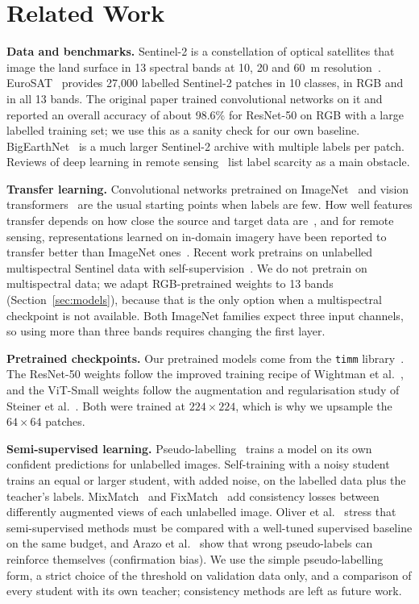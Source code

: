\documentclass[conference]{IEEEtran}
\begin{document}
\section{Related Work}\label{sec:related}
\textbf{Data and benchmarks.} Sentinel-2 is a constellation of optical satellites that image the land surface in 13 spectral bands at 10, 20 and 60~m resolution~\cite{drusch2012sentinel}. EuroSAT~\cite{helber2019eurosat} provides 27{,}000 labelled Sentinel-2 patches in 10 classes, in RGB and in all 13 bands. The original paper trained convolutional networks on it and reported an overall accuracy of about 98.6\% for ResNet-50 on RGB with a large labelled training set; we use this as a sanity check for our own baseline. BigEarthNet~\cite{sumbul2019bigearthnet} is a much larger Sentinel-2 archive with multiple labels per patch. Reviews of deep learning in remote sensing~\cite{zhu2017review} list label scarcity as a main obstacle.

\textbf{Transfer learning.} Convolutional networks pretrained on ImageNet~\cite{he2016resnet} and vision transformers~\cite{dosovitskiy2021vit} are the usual starting points when labels are few. How well features transfer depends on how close the source and target data are~\cite{yosinski2014transfer}, and for remote sensing, representations learned on in-domain imagery have been reported to transfer better than ImageNet ones~\cite{neumann2019indomain}. Recent work pretrains on unlabelled multispectral Sentinel data with self-supervision~\cite{wang2023ssl4eo,cong2022satmae}. We do not pretrain on multispectral data; we adapt RGB-pretrained weights to 13 bands (Section~\ref{sec:models}), because that is the only option when a multispectral checkpoint is not available. Both ImageNet families expect three input channels, so using more than three bands requires changing the first layer.

\textbf{Pretrained checkpoints.} Our pretrained models come from the \texttt{timm} library~\cite{wightman2019timm}. The ResNet-50 weights follow the improved training recipe of Wightman et al.~\cite{wightman2021rsb}, and the ViT-Small weights follow the augmentation and regularisation study of Steiner et al.~\cite{steiner2022augreg}. Both were trained at $224\times224$, which is why we upsample the $64\times64$ patches.

\textbf{Semi-supervised learning.} Pseudo-labelling~\cite{lee2013pseudo} trains a model on its own confident predictions for unlabelled images. Self-training with a noisy student~\cite{xie2020noisystudent} trains an equal or larger student, with added noise, on the labelled data plus the teacher's labels. MixMatch~\cite{berthelot2019mixmatch} and FixMatch~\cite{sohn2020fixmatch} add consistency losses between differently augmented views of each unlabelled image. Oliver et al.~\cite{oliver2018realistic} stress that semi-supervised methods must be compared with a well-tuned supervised baseline on the same budget, and Arazo et al.~\cite{arazo2020confirmation} show that wrong pseudo-labels can reinforce themselves (confirmation bias). We use the simple pseudo-labelling form, a strict choice of the threshold on validation data only, and a comparison of every student with its own teacher; consistency methods are left as future work.
\end{document}
